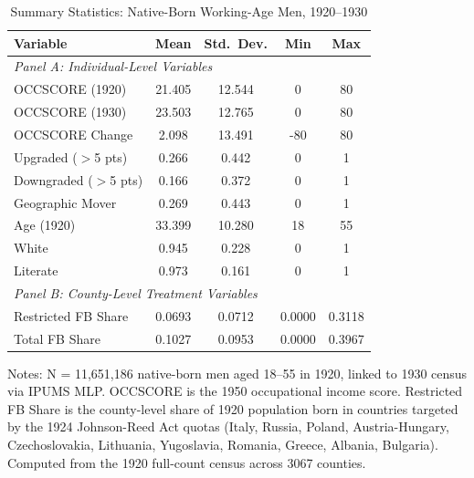 \begin{table}[H]
\centering
\caption{Summary Statistics: Native-Born Working-Age Men, 1920--1930}
\begin{threeparttable}
\begin{tabular}{lcccc}
\toprule
Variable & Mean & Std.\ Dev. & Min & Max \\
\midrule
\multicolumn{5}{l}{\textit{Panel A: Individual-Level Variables}} \\
OCCSCORE (1920) & 21.405 & 12.544 & 0 & 80 \\
OCCSCORE (1930) & 23.503 & 12.765 & 0 & 80 \\
OCCSCORE Change & 2.098 & 13.491 & -80 & 80 \\
Upgraded ($>$5 pts) & 0.266 & 0.442 & 0 & 1 \\
Downgraded ($>$5 pts) & 0.166 & 0.372 & 0 & 1 \\
Geographic Mover & 0.269 & 0.443 & 0 & 1 \\
Age (1920) & 33.399 & 10.280 & 18 & 55 \\
White & 0.945 & 0.228 & 0 & 1 \\
Literate & 0.973 & 0.161 & 0 & 1 \\
\midrule
\multicolumn{5}{l}{\textit{Panel B: County-Level Treatment Variables}} \\
Restricted FB Share & 0.0693 & 0.0712 & 0.0000 & 0.3118 \\
Total FB Share & 0.1027 & 0.0953 & 0.0000 & 0.3967 \\
\bottomrule
\end{tabular}
\begin{tablenotes}[flushleft]
\small
\item Notes: N = 11,651,186 native-born men aged 18--55 in 1920, linked to 1930 census via IPUMS MLP. OCCSCORE is the 1950 occupational income score. Restricted FB Share is the county-level share of 1920 population born in countries targeted by the 1924 Johnson-Reed Act quotas (Italy, Russia, Poland, Austria-Hungary, Czechoslovakia, Lithuania, Yugoslavia, Romania, Greece, Albania, Bulgaria). Computed from the 1920 full-count census across 3067 counties.
\end{tablenotes}
\end{threeparttable}
\label{tab:summary}
\end{table}
